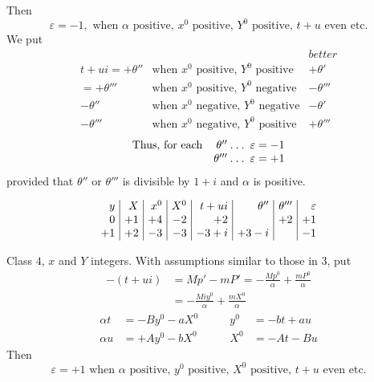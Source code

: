 Then
\[
\varepsilon=-1,\text{ when }\alpha\text{ positive, }x^0\text{ positive, }Y^0\text{ positive, }t+u\text{ even etc.}
\]
We put
\[
\begin{array}{rll}
&&\textit{better}\\
t+ui=+\theta''&\text{when }x^0\text{ positive, }Y^0\text{ positive}&+\theta'\\
=+\theta'''&\text{when }x^0\text{ positive, }Y^0\text{ negative}&-\theta'''\\
-\theta''&\text{when }x^0\text{ negative, }Y^0\text{ negative}&-\theta'\\
-\theta'''&\text{when }x^0\text{ negative, }Y^0\text{ positive}&+\theta'''
\end{array}
\]
\[
\begin{array}{lr}
\text{Thus, for each}&\theta''\mathbin{.}\mathbin{.}\mathbin{.}\;\varepsilon=-1\\
&\theta'''\mathbin{.}\mathbin{.}\mathbin{.}\;\varepsilon=+1
\end{array}
\]
provided that $\theta''$ or $\theta'''$ is divisible by $1+i$ and $\alpha$ is positive.

\[
\setlength{\arraycolsep}{4pt}
\begin{array}{r|r|r|r|r|r|r|r}
y&X&x^0&X^0&t+ui&\theta''&\theta'''&\varepsilon\\
0&+1&+4&-2&+2&&+2&+1\\
+1&+2&-3&-3&-3+i&+3-i&&-1
\end{array}
\]

Class $4$, $x$ and $Y$ integers. With assumptions similar to those in 3, put
\[
\begin{aligned}
-(t+ui)&=Mp'-mP'=-\frac{Mp^0}{\alpha}+\frac{mP^0}{\alpha}\\
&=-\frac{Miy^0}{\alpha}+\frac{mX^0}{\alpha}
\end{aligned}
\]
\[
\begin{alignedat}{2}
\alpha t&=-By^0-aX^0\qquad&y^0&=-bt+au\\
\alpha u&=+Ay^0-bX^0&X^0&=-At-Bu
\end{alignedat}
\]
Then
\[
\varepsilon=+1\text{ when }\alpha\text{ positive, }y^0\text{ positive, }X^0\text{ positive, }t+u\text{ even etc.}
\]

